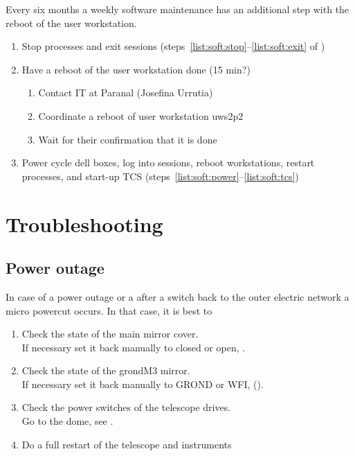 \documentclass[11pt,fleqn,a4paper]{book}
\begin{document}
Every six months a weekly software maintenance has an additional step with the reboot of the user workstation.

\begin{enumerate}
\item Stop processes and exit sessions (steps~\ref{list:soft:stop}--\ref{list:soft:exit} of )
\item Have a reboot of the user workstation done (15 min?)
    \begin{enumerate}
        \item Contact IT at Paranal (Josefina Urrutia) 
        \item Coordinate a reboot of user workstation \gls{uws2p2}
        \item Wait for their confirmation that it is done
    \end{enumerate}
\item Power cycle dell boxes, log into sessions, reboot workstations, restart processes, and start-up TCS (steps~\ref{list:soft:power}--\ref{list:soft:tcs})
\end{enumerate}


\chapter{Troubleshooting}
\label{chap:trouble}

\section{Power outage}
\label{sec:power}

In case of a power outage or a after a switch back to the outer electric network a micro powercut occurs.  In that case, it is best to

\begin{enumerate}
    \item Check the state of the \gls{main mirror} cover.\\
          If necessary set it back manually to closed or open, .
    \item Check the state of the \gls{grondM3} mirror.\\
          If necessary set it back manually to GROND or WFI,  ().
    \item Check the power switches of the telescope drives.\\
          Go to the dome, see .
    \item Do a full restart of the telescope and instruments
\end{enumerate}
\end{document}
